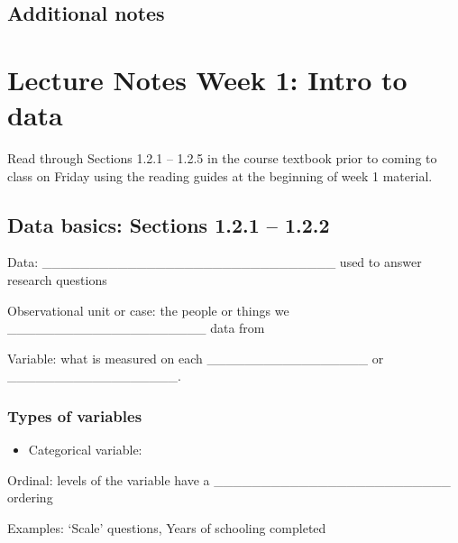 \documentclass[
]{report}
\providecommand{\tightlist}{%
  \setlength{\itemsep}{0pt}\setlength{\parskip}{0pt}}
\newcommand{\rgi}{\hspace{24pt}}  %
\begin{document}
\hypertarget{additional-notes}{%
\subsection{Additional notes}\label{additional-notes}}

\hypertarget{lecture-notes-week-1-intro-to-data}{%
\section{Lecture Notes Week 1: Intro to data}\label{lecture-notes-week-1-intro-to-data}}


Read through Sections 1.2.1 -- 1.2.5 in the course textbook prior to coming to class on Friday using the reading guides at the beginning of week 1 material.

\hypertarget{data-basics-sections-1.2.1-1.2.2}{%
\subsection*{Data basics: Sections 1.2.1 -- 1.2.2}\label{data-basics-sections-1.2.1-1.2.2}}

Data: \_\_\_\_\_\_\_\_\_\_\_\_\_\_\_\_\_\_\_\_\_\_\_\_\_\_\_\_\_\_\_ used to answer research questions

Observational unit or case: the people or things we \_\_\_\_\_\_\_\_\_\_\_\_\_\_\_\_\_\_\_\_\_ data from

Variable: what is measured on each \_\_\_\_\_\_\_\_\_\_\_\_\_\_\_\_\_ or
\_\_\_\_\_\_\_\_\_\_\_\_\_\_\_\_\_\_.

\hypertarget{types-of-variables}{%
\subsubsection*{Types of variables}\label{types-of-variables}}

\begin{itemize}
\tightlist
\item
  Categorical variable:
\end{itemize}

\vspace{0.5in}

\rgi Ordinal: levels of the variable have a \_\_\_\_\_\_\_\_\_\_\_\_\_\_\_\_\_\_\_\_\_\_\_\_\_ ordering

\rgi \rgi Examples: `Scale' questions, Years of schooling completed
\end{document}
